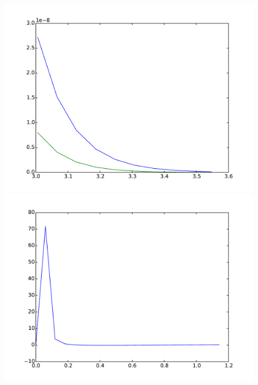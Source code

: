\documentclass{article}
\begin{document}
\begin{figure}[htb]
\begin{minipage}{.45\textwidth}
	\end{minipage}
	\begin{minipage}{.45\textwidth}
		\centering
		\includegraphics[width=0.97\linewidth]{bootstrap-filter/tail_simple_3_3.pdf}
	\end{minipage}
	\begin{minipage}{.45\textwidth}
		\centering
		\includegraphics[width=0.97\linewidth]{bootstrap-filter/relative_beginning_simple_3_3.pdf}
	\end{minipage}
	\begin{minipage}{.45\textwidth}
		\centering

\end{minipage}
\end{figure}
\end{document}
